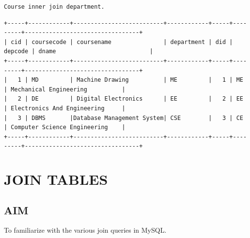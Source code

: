 \documentclass{article}
\begin{document}
\begin{flushleft}
\begin{verbatim}
Course inner join department.
\end{verbatim}
\fontsize{8pt}{8pt}\selectfont
\begin{verbatim}
+-----+------------+--------------------------+------------+-----+---------+---------------------------------+
| cid | coursecode | coursename               | department | did | depcode | dname                           |
+-----+------------+--------------------------+------------+-----+---------+---------------------------------+
|   1 | MD         | Machine Drawing          | ME         |   1 | ME      | Mechanical Engineering          |
|   2 | DE         | Digital Electronics      | EE         |   2 | EE      | Electronics And Engineering     |
|   3 | DBMS       |Database Management System| CSE        |   3 | CE      | Computer Science Engineering    |
+-----+------------+--------------------------+------------+-----+---------+---------------------------------+

\end{verbatim}
\fontsize{12pt}{12pt}\selectfont
\newpage
\section{JOIN TABLES}
\hrulefill
\vspace{1cm}
\subsection{AIM}
To familiarize with the various join queries in MySQL.

\end{flushleft}
\end{document}
